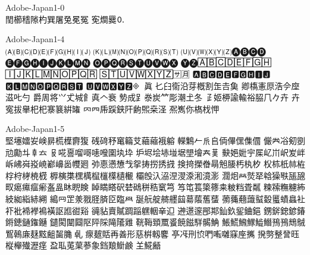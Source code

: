 %
%
%
%


Adobe-Japan1-0\\
𨳝櫛𥡴𨻶杓巽屠兔冕冤
𡨚𤏐爨🄀

Adobe-Japan1-4\\
🄐🄑🄒🄓🄔🄕🄖🄗🄘🄙
🄚🄛🄜🄝🄞🄟🄠🄡🄢🄣
🄤🄥🄦🄧🄨🄩🅐🅑🅒🅓
🅔🅕🅖🅗🅘🅙🅚🅛🅜🅝
🅞🅟🅠🅡🅢🅣🅤🅥🅦🅧
🅨🅩🄰🄱🄲🄳🄴🄵🄶🄷
🄸🄹🄺🄻🄼🄽🄾🄿🅀🅁
🅂🅃🅄🅅🅆🅇🅈🅉🈂🈷
🅰🅱🅲🅳🅴🅵🅶🅷🅸🅹
🅺🅻🅼🅽🅾🅿🆀🆁🆂🆃
🆄🆅🆆🆇🆈🆉🞜𛄲𛅕眞
𠤎𦥑𫟘沿芽槪割𦈢𠮷𩵋
卿𫞎憲𠩤浩𫝆𫝷滋𠮟勺
爵周将𭕄𠀋城𩙿真𠆢𮕩
𫝑成𧾷𣳾炭𥫗彫潮𡈽冬
𤴔姬𫞉諭輸𥙿𦚰𠘨𠂊𠦄
卉寃拔𦦙𣏌杞𪧦𫞽絣𮉸
𠔿𦉪𠂰𮛪𨦇𨸗𫠚𤋮桒𣲾
𠘑嶲你𣘺𣏾𢘉

Adobe-Japan1-5\\
𡌛𡑮𡢽𡚴𡸴𣇄𣗄𣜿𣝣𤟱
𥒎𥔎𥝱𥧄𥶡𦫿𦹀𧃴𧚄𨉷
𨏍𪆐𠂉𠂢𠂤𠈓𠌫𠎁𠍱𠏹
𠑊𠔉𠗖𠝏𠠇𠠺𠢹𠥼𠦝𠫓
𠬝𠵅𠷡𠺕𠹭𠹤𠽟𡈁𡉕𡉻
𡉴𡋤𡋗𡋽𡌶𡍄𡏄𡑭𡗗𦰩
𡙇𡜆𡝂𡧃𡱖𡴭𡵅𡵸𡵢𡶡
𡶜𡶒𡶷𡷠𡸳𡼞𡽶𡿺𢅻𢌞
𢎭𢛳𢡛𢢫𢦏𢪸𢭏𢭐𢭆𢰝
𢮦𢰤𢷡𣇃𣇵𣆶𣍲𣏓𣏒𣏐
𣏤𣏕𣏚𣏟𣑊𣑑𣑋𣑥𣓤𣕚
𣖔𣘹𣙇𣘸𣜜𣜌𣝤𣟿𣟧𣠤
𣠽𣪘𣱿𣴀𣵀𣷺𣷹𣷓𣽾𤂖
𤄃𤇆𤇾𤎼𤘩𤚥𤢖𤩍𤭖𤭯
𤰖𤸎𤸷𤹪𤺋𥁊𥁕𥄢𥆩𥇥
𥇍𥈞𥉌𥐮𥓙𥖧𥞩𥞴𥧔𥫤
𥫣𥫱𥮲𥱋𥱤𥸮𥹖𥹥𥹢𥻘
𥻂𥻨𥼣𥽜𥿠𥿔𦀌𥿻𦀗𦁠
𦃭𦉰𦊆𣴎𦐂𦙾𦜝𦣝𦣪𦥯
𦧝𦨞𦩘𦪌𦪷𦱳𦳝𦹥𦾔𦿸
𦿶𦿷𧄍𧄹𧏛𧏚𧏾𧐐𧑉𧘕
𧘔𧘱𧚓𧜎𧜣𧝒𧦅𧪄𧮳𧮾
𧯇𧲸𧶠𧸐𨂊𨂻𨊂𨋳𨐌𨑕
𨕫𨗈𨗉𨛗𨛺𨥉𨥆𨥫𨦈𨦺
𨦻𨨞𨨩𨩱𨩃𨪙𨫍𨫤𨫝𨯁
𨯯𨴐𨵱𨷻𨸟𨸶𨺉𨻫𨼲𨿸
𩊠𩊱𩒐𩗏𩛰𩜙𩝐𩣆𩩲𩷛
𩸕𩺊𩹉𩻄𩻩𩻛𩿎𩿗𪀯𪀚
𪃹𪂂𢈘𪎌𪐷𪗱𪘂𪚲𱍐𠃵
𤸄𤿲𧵳再善形慈栟軔𪊲
𠅘𠖱𠛬𫝓𠵘𫝚𫝜𥧌𫝶𢹂
𫝼𠟈𢿫𧦴𫞂𫞋𣟱𫞔𤁋𫞬
𫞯𫟉𫟏𫟒𦲞𧰼𫟰𫝥𫠍𫠗
𦍌𩸽𪘚

